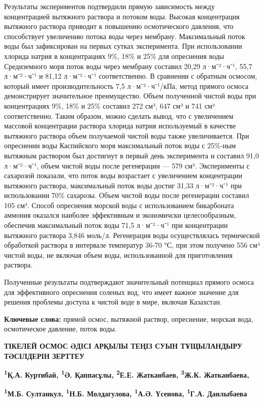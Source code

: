 Результаты экспериментов подтвердили прямую зависимость между
концентрацией вытяжного раствора и потоком воды. Высокая концентрация
вытяжного раствора приводит к повышению осмотического давления, что
способствует увеличению потока воды через мембрану. Максимальный поток
воды был зафиксирован на первых сутках эксперимента. При использовании
хлорида натрия в концентрациях 9\%, 18\% и 25\% для опреснения воды
Средиземного моря поток воды через мембрану составил 20,29 л·м⁻²·ч⁻¹,
55,7 л·м⁻²·ч⁻¹ и 81,12 л·м⁻²·ч⁻¹ соответственно. В сравнении с обратным
осмосом, который имеет производительность 7,5 л·м⁻²·ч⁻¹/кПа, метод
прямого осмоса демонстрирует значительное преимущество. Объем полученной
чистой воды при концентрациях 9\%, 18\% и 25\% составил 272 см³, 647 см³
и 741 см³ соответственно. Таким образом, можно сделать вывод, что с
увеличением массовой концентрации раствора хлорида натрия используемый в
качестве вытяжного раствора объем получаемой чистой воды также
увеличивается. При опреснении воды Каспийского моря максимальный поток
воды с 25\%-ным вытяжным раствором был достигнут в первый день
эксперимента и составил 91,0 л·м⁻²·ч⁻¹, объем чистой воды после
регенерации --- 579 см³. Эксперименты с сахарозой показали, что поток
воды возрастает с увеличением концентрации вытяжного раствора,
максимальный поток воды достиг 31,33 л·м⁻²·ч⁻¹ при использовании 70\%
сахарозы. Объем чистой воды после регенерации составил 105 см³. Способ
опреснения морской воды с использованием бикарбоната аммония оказался
наиболее эффективным и экономичски целесообразным, обеспечив
максимальный поток воды 71,5 л·м⁻²·ч⁻¹ при концентрации вытяжного
раствора 3,846 моль/л. Регенерация воды осуществлялась термической
обработкой раствора в интервале температур 36-70 °С, при этом получено
556 см³ чистой воды, не включая объем воды, использованной для
приготовления раствора.

Полученные результаты подтверждают значительный потенциал прямого осмоса
для эффективного опреснения соленых вод, что имеет важное значение для
решения проблемы доступа к чистой воде в мире, включая Казахстан.

{\bfseries Ключевые слова:} прямой осмос, вытяжной раствор, опреснение,
морская вода, осмотическое давление, поток воды.

\begin{articleheader}
{\bfseries ТІКЕЛЕЙ ОСМОС ӘДІСІ АРҚЫЛЫ ТЕҢІЗ СУЫН ТҰЩЫЛАНДЫРУ ТӘСІЛДЕРІН
ЗЕРТТЕУ}

{\bfseries \textsuperscript{1}Қ.А. Куртибай}\textsuperscript{\envelope }{\bfseries ,
\textsuperscript{1}Ә. Қаппасұлы, \textsuperscript{2}Е.Е. Жатканбаев,
\textsuperscript{3}Ж.К. Жатканбаева,}

{\bfseries \textsuperscript{1}М.Б. Султанкул, \textsuperscript{1}Н.Б.
Молдагулова, \textsuperscript{1}А.Ә. Үсенова, \textsuperscript{1}Г.А.
Данлыбаева}
\end{articleheader}

